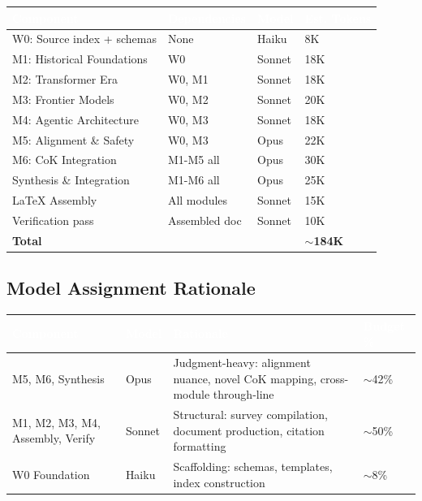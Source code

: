 \documentclass[11pt,letterpaper]{article}
\newcommand{\tableheader}[1]{\textbf{\sffamily\textcolor{white}{#1}}}
\begin{document}
\begin{center}
\begin{tabularx}{\textwidth}{L{3.5cm}L{2.5cm}C{1.5cm}C{2cm}}
\toprule
{}
\tableheader{Component} & \tableheader{Dependencies} & \tableheader{Model} & \tableheader{Est. Tokens} \\
\midrule
W0: Source index + schemas & None & Haiku & 8K \\
M1: Historical Foundations & W0 & Sonnet & 18K \\
M2: Transformer Era & W0, M1 & Sonnet & 18K \\
M3: Frontier Models & W0, M2 & Sonnet & 20K \\
M4: Agentic Architecture & W0, M3 & Sonnet & 18K \\
M5: Alignment \& Safety & W0, M3 & Opus & 22K \\
M6: CoK Integration & M1-M5 all & Opus & 30K \\
Synthesis \& Integration & M1-M6 all & Opus & 25K \\
LaTeX Assembly & All modules & Sonnet & 15K \\
Verification pass & Assembled doc & Sonnet & 10K \\
\midrule
\textbf{Total} & & & \textbf{$\sim$184K} \\
\bottomrule
\end{tabularx}
\end{center}

\subsection{Model Assignment Rationale}

\begin{center}
\begin{tabularx}{\textwidth}{L{2cm}C{1.5cm}XC{2cm}}
\toprule
{}
\tableheader{Component} & \tableheader{Model} & \tableheader{Rationale} & \tableheader{Budget \%} \\
\midrule
M5, M6, Synthesis & Opus & Judgment-heavy: alignment nuance, novel CoK mapping, cross-module through-line & $\sim$42\% \\
M1, M2, M3, M4, Assembly, Verify & Sonnet & Structural: survey compilation, document production, citation formatting & $\sim$50\% \\
W0 Foundation & Haiku & Scaffolding: schemas, templates, index construction & $\sim$8\% \\
\bottomrule
\end{tabularx}
\end{center}
\end{document}
